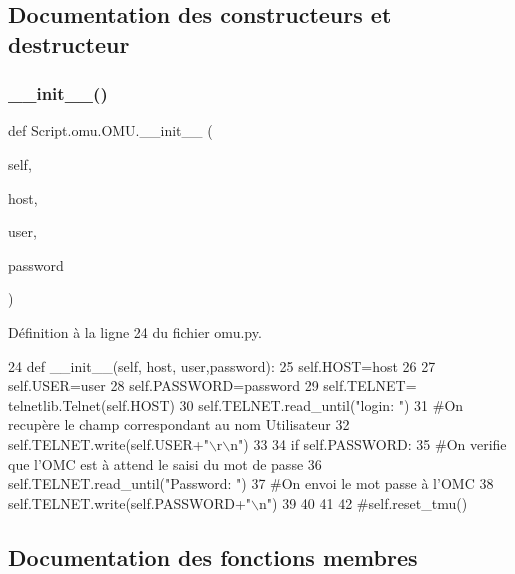 \subsection{Documentation des constructeurs et destructeur}
\mbox{\label{classScript_1_1omu_1_1OMU_a1be569a13c8e86722862b330c90c4091}} 
\subsubsection{\texorpdfstring{\+\_\+\+\_\+init\+\_\+\+\_\+()}{\_\_init\_\_()}}
{\footnotesize\ttfamily def Script.\+omu.\+O\+M\+U.\+\_\+\+\_\+init\+\_\+\+\_\+ (\begin{DoxyParamCaption}\item[{}]{self,  }\item[{}]{host,  }\item[{}]{user,  }\item[{}]{password }\end{DoxyParamCaption})}



Définition à la ligne 24 du fichier omu.\+py.


\begin{DoxyCode}
24     \textcolor{keyword}{def }\_\_init\_\_(self, host, user,password):
25         self.HOST=host
26         
27         self.USER=user
28         self.PASSWORD=password 
29         self.TELNET= telnetlib.Telnet(self.HOST)
30         self.TELNET.read\_until(\textcolor{stringliteral}{"login: "})
31         \textcolor{comment}{#On recupère le champ correspondant au nom Utilisateur
}
32         self.TELNET.write(self.USER+\textcolor{stringliteral}{"\(\backslash\)r\(\backslash\)n"})
33 
34         \textcolor{keywordflow}{if} self.PASSWORD:
35             \textcolor{comment}{#On verifie que l'OMC est à attend le saisi du mot de passe
}
36             self.TELNET.read\_until(\textcolor{stringliteral}{"Password: "})
37             \textcolor{comment}{#On envoi le mot passe à l'OMC
}
38             self.TELNET.write(self.PASSWORD+\textcolor{stringliteral}{"\(\backslash\)n"})
39 
40 
41 
42         \textcolor{comment}{#self.reset\_tmu()
}
\end{DoxyCode}


\subsection{Documentation des fonctions membres}
\mbox{\label{classScript_1_1omu_1_1OMU_a1c92aa9df1f555d88f49669556a7ef09}} 
